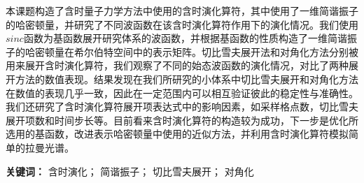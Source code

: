 
本课题构造了含时量子力学方法中使用的含时演化算符，其中使用了一维简谐振子的哈密顿量，并研究了不同波函数在该含时演化算符作用下的演化情况。我们使用$sinc$函数为基函数展开研究体系的波函数，并根据基函数的性质构造了一维简谐振子的哈密顿量在希尔伯特空间中的表示矩阵。切比雪夫展开法和对角化方法分别被用来展开含时演化算符，我们观察了不同的始态波函数的演化情况，对比了两种展开方法的数值表现。结果发现在我们所研究的小体系中切比雪夫展开和对角化方法在数值的表现几乎一致，因此在一定范围内可以相互验证彼此的稳定性与准确性。我们还研究了含时演化算符展开项表达式中的影响因素，如采样格点数，切比雪夫展开项数和时间步长等。目前看来含时演化算符的构造较为成功，下一步是优化所选用的基函数，改进表示哈密顿量中使用的近似方法，并利用含时演化算符模拟简单的拉曼光谱。

\bigskip
\noindent \textbf{关键词：\hspace{\Han}}
含时演化； \;
简谐振子； \;
切比雪夫展开； \;
对角化